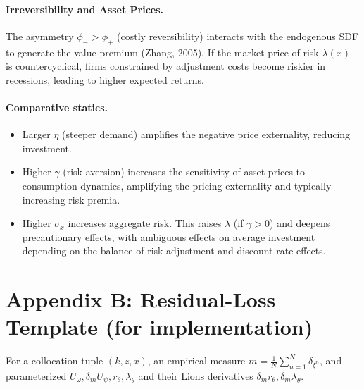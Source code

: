 \documentclass[11pt,letterpaper,oneside]{article}
\newcommand{\dmU}{\delta_m U}
\begin{document}
\paragraph{Irreversibility and Asset Prices.}
The asymmetry $\phi_->\phi_+$ (costly reversibility) interacts with the endogenous SDF to generate the value premium (Zhang, 2005). If the market price of risk $\lambda(x)$ is countercyclical, firms constrained by adjustment costs become riskier in recessions, leading to higher expected returns.

\paragraph{Comparative statics.}
\begin{itemize}[leftmargin=1.25em]
\item Larger $\eta$ (steeper demand) amplifies the negative price externality, reducing investment.
\item Higher $\gamma$ (risk aversion) increases the sensitivity of asset prices to consumption dynamics, amplifying the pricing externality and typically increasing risk premia.
\item Higher $\sigma_x$ increases aggregate risk. This raises $\lambda$ (if $\gamma>0$) and deepens precautionary effects, with ambiguous effects on average investment depending on the balance of risk adjustment and discount rate effects.
\end{itemize}

\section{Appendix B: Residual-Loss Template (for implementation)}\label{app:loss}

For a collocation tuple $(k,z,x)$, an empirical measure $m=\tfrac1N\sum_{n=1}^N \delta_{\xi^n}$, and parameterized $U_\omega,\dmU_\psi, r_\theta, \lambda_\theta$ and their Lions derivatives $\delta_m r_\theta, \delta_m \lambda_\theta$.
\end{document}
